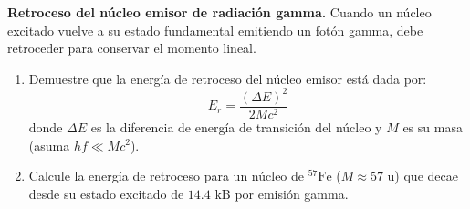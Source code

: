 \item \textbf{Retroceso del núcleo emisor de radiación gamma.}
Cuando un núcleo excitado vuelve a su estado fundamental emitiendo un fotón gamma, debe retroceder para conservar el momento lineal.
\begin{enumerate}
    \item Demuestre que la energía de retroceso del núcleo emisor está dada por:
    $$ E_r = \frac{(\Delta E)^2}{2 M c^2} $$
    donde $\Delta E$ es la diferencia de energía de transición del núcleo y $M$ es su masa (asuma $hf \ll M c^2$).
    \item Calcule la energía de retroceso para un núcleo de $^{57}\text{Fe}$ ($M \approx 57\text{ u}$) que decae desde su estado excitado de $14.4\text{ kB}$ por emisión gamma.
\end{enumerate}